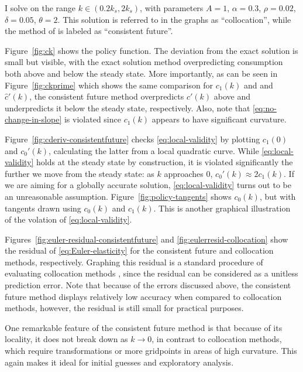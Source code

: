 \documentclass[a4paper,11pt]{article}
\newcommand{\hc}{\hat{c}}
\begin{document}
I solve on the range $k \in (0.2 k_s, 2 k_s)$, with parameters $A=1$, $\alpha=0.3$, $\rho=0.02$, $\delta=0.05$, $\theta=2$.  This solution is referred to in the graphs as ``collocation'', while the method of \textcite{den2015exact} is labeled as ``consistent future''.

Figure~\ref{fig:ck} shows the policy function. The deviation from the exact solution is small but visible, with the exact solution method overpredicting consumption both above and below the steady state. More importantly, as can be seen in Figure~\ref{fig:ckprime} which shows the same comparison for $c_1(k)$ and and $\hc'(k)$, the consistent future method overpredicts $c'(k)$ above and underpredicts it below the steady state, respectively. Also, note that \eqref{eq:no-change-in-slope} is violated since $c_1(k)$ appears to have significant curvature.

Figure~\ref{fig:cderiv-consistentfuture} checks \eqref{eq:local-validity} by plotting $c_1(0)$ and $c_0'(k)$, calculating the latter from a local quadratic curve. While \eqref{eq:local-validity} holds at the steady state by construction, it is violated significantly the further we move from the steady state: as $k$ approaches $0$, $c_0'(k) \approx 2 c_1(k)$. If we are aiming for a globally accurate solution, \eqref{eq:local-validity} turns out to be an unreasonable assumption. Figure~\ref{fig:policy-tangents} shows $c_0(k)$, but with tangents drawn using $c_0(k)$ and $c_1(k)$. This is another graphical illustration of the volation of \eqref{eq:local-validity}.

Figures~\ref{fig:euler-residual-consistentfuture} and \ref{fig:eulerresid-collocation} show the residual of \eqref{eq:Euler-elasticity} for the consistent future and collocation methods, respectively. Graphing this residual is a standard procedure of evaluating collocation methods \parencite{boyd2001chebyshev, judd98:_numer_method_in_econom}, since the residual can be considered as a unitless prediction error. Note that because of the errors discussed above, the consistent future method displays relatively low accuracy when compared to collocation methods, however, the residual is still small for practical purposes.

One remarkable feature of the consistent future method is that because of its locality, it does not break down as $k\to0$, in contrast to collocation methods, which require transformations or more gridpoints in areas of high curvature. This again makes it ideal for initial guesses and exploratory analysis.
\end{document}
